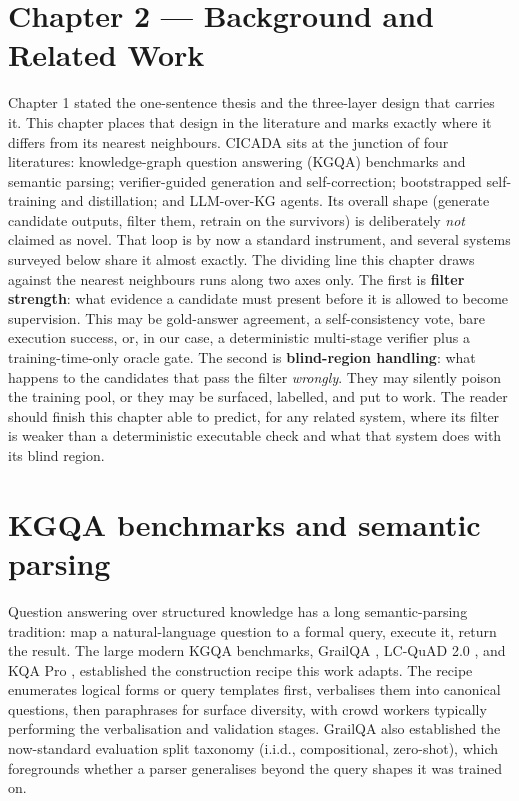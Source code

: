 \section{Chapter 2 --- Background and Related Work}\label{sec:chapter-2-background-and-related-work}

Chapter 1 stated the one-sentence thesis and the three-layer design that carries it. This chapter places that design in the literature and marks exactly where it differs from its nearest neighbours. CICADA sits at the junction of four literatures: knowledge-graph question answering (KGQA) benchmarks and semantic parsing; verifier-guided generation and self-correction; bootstrapped self-training and distillation; and LLM-over-KG agents. Its overall shape (generate candidate outputs, filter them, retrain on the survivors) is deliberately \emph{not} claimed as novel. That loop is by now a standard instrument, and several systems surveyed below share it almost exactly. The dividing line this chapter draws against the nearest neighbours runs along two axes only. The first is \textbf{filter strength}: what evidence a candidate must present before it is allowed to become supervision. This may be gold-answer agreement, a self-consistency vote, bare execution success, or, in our case, a deterministic multi-stage verifier plus a training-time-only oracle gate. The second is \textbf{blind-region handling}: what happens to the candidates that pass the filter \emph{wrongly}. They may silently poison the training pool, or they may be surfaced, labelled, and put to work. The reader should finish this chapter able to predict, for any related system, where its filter is weaker than a deterministic executable check and what that system does with its blind region.

\section{KGQA benchmarks and semantic parsing}\label{sec:kgqa-benchmarks-and-semantic-parsing}

Question answering over structured knowledge has a long semantic-parsing tradition: map a natural-language question to a formal query, execute it, return the result. The large modern KGQA benchmarks, GrailQA \citep{gu2023pangu}, LC-QuAD 2.0 \citep{dubey2019lcquad2}, and KQA Pro \citep{cao2022kqapro}, established the construction recipe this work adapts. The recipe enumerates logical forms or query templates first, verbalises them into canonical questions, then paraphrases for surface diversity, with crowd workers typically performing the verbalisation and validation stages. GrailQA also established the now-standard evaluation split taxonomy (i.i.d., compositional, zero-shot), which foregrounds whether a parser generalises beyond the query shapes it was trained on.

